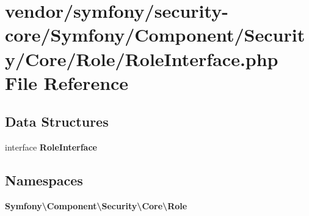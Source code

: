 \section{vendor/symfony/security-\/core/\+Symfony/\+Component/\+Security/\+Core/\+Role/\+Role\+Interface.php File Reference}
\label{_role_interface_8php}
\subsection*{Data Structures}
\begin{DoxyCompactItemize}
\item 
interface {\bf Role\+Interface}
\end{DoxyCompactItemize}
\subsection*{Namespaces}
\begin{DoxyCompactItemize}
\item 
 {\bf Symfony\textbackslash{}\+Component\textbackslash{}\+Security\textbackslash{}\+Core\textbackslash{}\+Role}
\end{DoxyCompactItemize}
